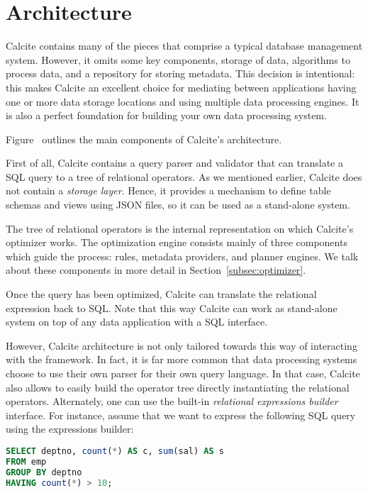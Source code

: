 \section{Architecture}
\label{sec:archi}

Calcite contains many of the pieces that comprise a typical database management system. However, it omits some key components, \eg storage of data, algorithms to process data, and a repository for storing metadata. This decision is intentional: this makes Calcite an excellent choice for mediating between applications having one or more data storage locations and using multiple data processing engines. It is also a perfect foundation for building your own data processing system.

Figure~ outlines the main components of Calcite's architecture.

First of all, Calcite contains a query parser and validator that can translate a SQL query to a tree of relational operators. As we mentioned earlier, Calcite does not contain a \textit{storage layer}. Hence, it provides a mechanism to define table schemas and views using JSON files, so it can be used as a stand-alone system.

The tree of relational operators is the internal representation on which Calcite's optimizer works. The optimization engine consists mainly of three components which guide the process: rules, metadata providers, and planner engines. We talk about these components in more detail in Section~\ref{subsec:optimizer}.

Once the query has been optimized, Calcite can translate the relational expression back to SQL. Note that this way Calcite can work as stand-alone system on top of any data application with a SQL interface.

However, Calcite architecture is not only tailored towards this way of interacting with the framework. In fact, it is far more common that data processing systems choose to use their own parser for their own query language. In that case, Calcite also allows to easily build the operator tree directly instantiating the relational operators. Alternately, one can use the built-in \textit{relational expressions builder} interface. For instance, assume that we want to express the following SQL query using the expressions builder:

\begin{lstlisting}[language=SQL]
SELECT deptno, count(*) AS c, sum(sal) AS s
FROM emp
GROUP BY deptno
HAVING count(*) > 10;
\end{lstlisting}

